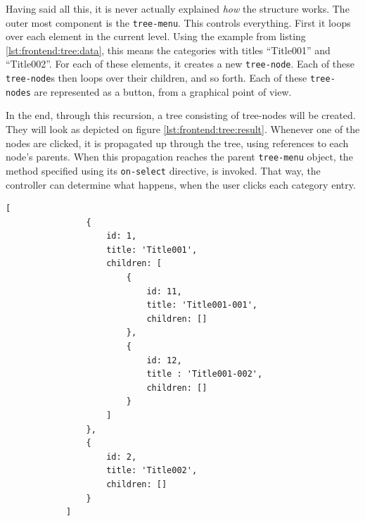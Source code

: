 		Having said all this, it is never actually explained \emph{how} the structure works. The outer most component is the \verb=tree-menu=. This controls everything. First it loops over each element in the current level. Using the example from listing \ref{lst:frontend:tree:data}, this means the categories with titles ``Title001'' and ``Title002''. For each of these elements, it creates a new \verb=tree-node=. Each of these \verb=tree-node=s then loops over their children, and so forth. Each of these \verb=tree-nodes= are represented as a button, from a graphical point of view.

		In the end, through this recursion, a tree consisting of tree-nodes will be created. They will look as depicted on figure \ref{lst:frontend:tree:result}. Whenever one of the nodes are clicked, it is propagated up through the tree, using references to each node's parents. When this propagation reaches the parent \verb=tree-menu= object, the method specified using its \verb=on-select= directive, is invoked. That way, the controller can determine what happens, when the user clicks each category entry.


		\begin{lstlisting}[style=json2,gobble=12, caption={The front-end's category tree data structure},label={lst:frontend:tree:data}]
            [
                {
                    id: 1,
                    title: 'Title001',
                    children: [
                        {
                            id: 11,
                            title: 'Title001-001',
                            children: []
                        },
                        {
                            id: 12,
                            title : 'Title001-002',
                            children: []
                        }
                    ]
                },
                {
                    id: 2,
                    title: 'Title002',
                    children: []
                }
            ]
		\end{lstlisting}
	
